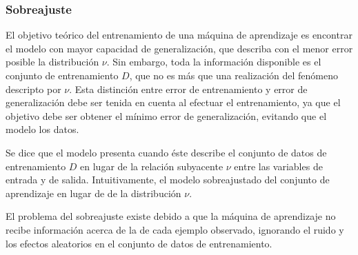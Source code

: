 %
\subsubsection{Sobreajuste}
%
El objetivo teórico del entrenamiento de una máquina de aprendizaje es
encontrar el modelo con mayor capacidad de generalización, que
describa con el menor error posible la distribución $\nu$. Sin
embargo, toda la información disponible es el conjunto de
entrenamiento $D$, que no es más que una realización del fenómeno
descripto por $\nu$. Esta distinción entre error de entrenamiento y
error de generalización debe ser tenida en cuenta al efectuar el
entrenamiento, ya que el objetivo debe ser obtener el mínimo error de
generalización, evitando que el modelo  los datos.

Se dice que el modelo presenta  cuando éste describe
el conjunto de datos de entrenamiento $D$ en lugar de la relación
subyacente $\nu$ entre las variables de entrada y de salida.
Intuitivamente, el modelo sobreajustado
 del conjunto de aprendizaje en lugar de
 de la distribución $\nu$.

El problema del
sobreajuste existe debido a que la máquina de aprendizaje no recibe
información acerca de la  de cada ejemplo observado,
ignorando el ruido y los efectos aleatorios en el conjunto de datos de
entrenamiento.
